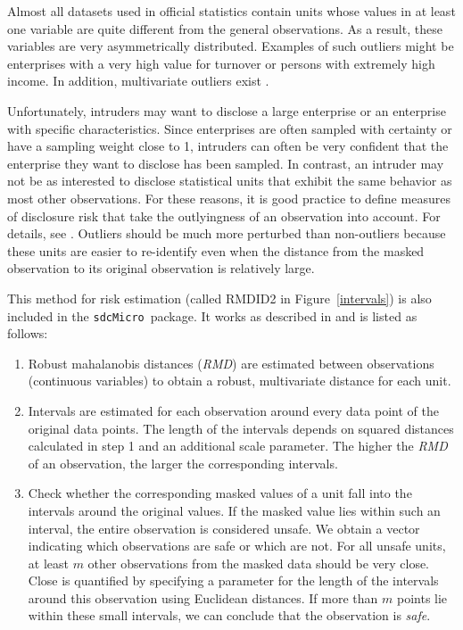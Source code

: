 \documentclass[12pt]{scrartcl}\usepackage[]{graphicx}\usepackage[]{color}
\newcommand{\sdcMicro}{\texttt{sdcMicro}}
\begin{document}
Almost all datasets used in official statistics contain units whose values in at least one variable are quite different from the general observations. As a result, these variables are very asymmetrically distributed. Examples of such outliers might be enterprises with a very high value for turnover or persons with extremely high income. In addition, multivariate outliers exist \citep[see][]{Templ08d}.

Unfortunately, intruders may want to disclose a large enterprise or an enterprise with specific characteristics. Since enterprises are often sampled with certainty or have a sampling weight close to 1, intruders can often be very confident that the enterprise they want to disclose has been sampled. In contrast, an intruder may not be as interested to disclose statistical units that exhibit the same behavior as most other observations. For these reasons, it is good practice to define measures of disclosure risk that take the outlyingness of an observation into account. For details, see \cite{Templ08d}. Outliers should be much more perturbed than non-outliers because these units are easier to re-identify even when the distance from the masked observation to its original observation is relatively large.

This method for risk estimation (called RMDID2 in Figure~\ref{intervals}) is also included in the \sdcMicro \ package. It works as described in  \cite{Templ08d} and is listed as follows:

\begin{enumerate}
\item Robust mahalanobis distances (\textit{RMD}) \citep[see, for example][]{Maronna06} are estimated between observations
(continuous variables) to obtain a robust, multivariate distance for each unit.
\item Intervals are estimated for each observation around every data point of the original data points. The length of the intervals depends on squared distances calculated in step 1 and an additional scale parameter. The higher the \textit{RMD} of an observation, the larger the corresponding intervals.
\item Check whether the corresponding masked values of a unit fall into the intervals around the original values. If the masked value lies within such an interval, the entire observation is considered unsafe. We obtain a vector indicating which observations are safe or which are not. For all unsafe units, at least $m$ other observations from the masked data should be very close. Close is quantified by specifying a parameter for the length of the intervals around this observation using Euclidean distances. If more than $m$ points lie within these small intervals, we can conclude that the observation is \textit{safe}.
\end{enumerate}
\end{document}

